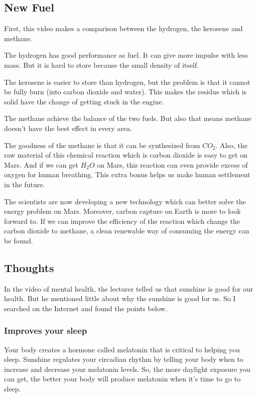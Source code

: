 \documentclass{article}
\begin{document}
\subsection{New Fuel}
First, this video makes a comparison between the hydrogen, the kerosene and methane.

The hydrogen has good performance as fuel. It can give more impulse with less mass. But it is hard to store because the small density of itself.

The kerosene is easier to store than hydrogen, but the problem is that it cannot be fully burn (into carbon dioxide and water). This makes the residue which is solid have the change of getting stuck in the engine.

The methane achieve the balance of the two fuels. But also that means methane doesn't have the best effect in every area.

The goodness of the methane is that it can be synthesized from $CO_2$. Also, the raw material of this chemical reaction which is carbon dioxide is easy to get on Mars. And if we can get $H_2O$ on Mars, this reaction can even provide excess of oxygen for human breathing. This extra bonus helps us make human settlement in the future.

The scientists are now developing a new technology which can better solve the energy problem on Mars. Moreover, carbon capture on Earth is more to look forward to. If we can improve the efficiency of the reaction which change the carbon dioxide to methane, a clean renewable way of consuming the energy can be found.


\subsection{Thoughts}

In the video of mental health, the lecturer telled us that sunshine is good for our health. But he mentioned little about why the sunshine is good for us. So I searched on the Internet and found the points below.

\subsubsection*{Improves your sleep}

Your body creates a hormone called melatonin that is critical to helping you sleep. Sunshine regulates your circadian rhythm by telling your body when to increase and decrease your melatonin levels. So, the more daylight exposure you can get, the better your body will produce melatonin when it’s time to go to sleep.
\end{document}
